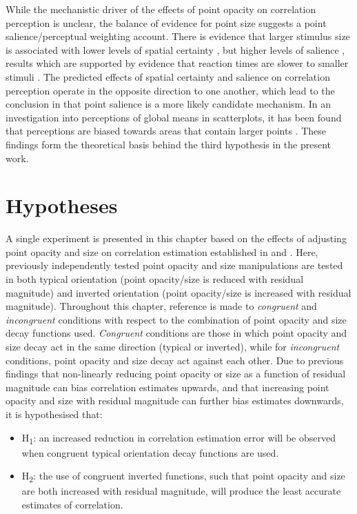 \documentclass[../main.tex]{subfiles}
\begin{document}
While the mechanistic driver of the effects of point opacity on
correlation perception is unclear, the balance of evidence for point
size suggests a point salience/perceptual weighting account. There is
evidence that larger stimulus size is associated with lower levels of
spatial certainty \cite{alais_2004}, but higher levels of salience
\cite{healey_2012}, results which are supported by evidence that
reaction times are slower to smaller stimuli
\cite{gramazio_2014, osaka_1976}. The predicted effects of spatial
certainty and salience on correlation perception operate in the opposite
direction to one another, which lead to the conclusion in
 that point salience is a more likely
candidate mechanism. In an investigation into perceptions of global
means in scatterplots, it has been found that perceptions are biased
towards areas that contain larger points \cite{hong_2022}. These
findings form the theoretical basis behind the third hypothesis in the
present work.

\section{Hypotheses}\label{hypotheses-interactions}

A single experiment is presented in this chapter based on the effects of
adjusting point opacity and size on correlation estimation established
in  and . Here,
previously independently tested point opacity and size manipulations are
tested in both typical orientation (point opacity/size is reduced with
residual magnitude) and inverted orientation (point opacity/size is
increased with residual magnitude). Throughout this chapter, reference
is made to \emph{congruent} and \emph{incongruent} conditions with
respect to the combination of point opacity and size decay functions
used. \emph{Congruent} conditions are those in which point opacity and
size decay act in the same direction (typical or inverted), while for
\emph{incongruent} conditions, point opacity and size decay act against
each other. Due to previous findings that non-linearly reducing point
opacity or size as a function of residual magnitude can bias correlation
estimates upwards, and that increasing point opacity and size with
residual magnitude can further bias estimates downwards, it is
hypothesised that:

\begin{itemize}
\tightlist
\item
  H\textsubscript{1}: an increased reduction in correlation estimation
  error will be observed when congruent typical orientation decay
  functions are used.
\item
  H\textsubscript{2}: the use of congruent inverted functions, such that
  point opacity and size are both increased with residual magnitude,
  will produce the least accurate estimates of correlation.
\end{itemize}
\end{document}
